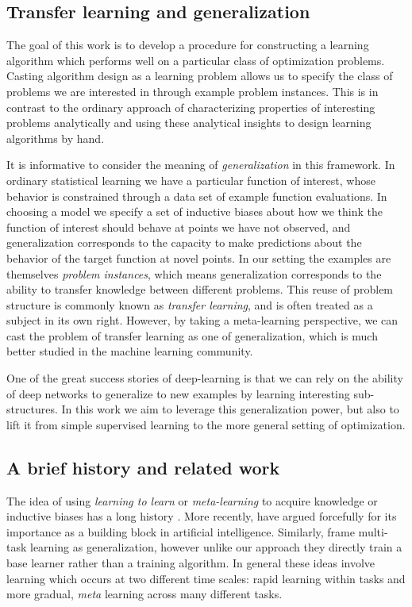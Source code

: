 \subsection{Transfer learning and generalization}

The goal of this work is to develop a procedure for constructing a learning
algorithm which performs well on a particular class of optimization problems.
Casting algorithm design as a learning problem allows us to specify the class
of problems we are interested in through example problem instances.  This is in
contrast to the ordinary approach of characterizing properties of interesting
problems analytically and using these analytical insights to design learning
algorithms by hand.

It is informative to consider the meaning of \emph{generalization} in this
framework.  In ordinary statistical learning we have a particular function of
interest, whose behavior is constrained through a data set of example function
evaluations.  In choosing a model we specify a set of inductive biases about
how we think the function of interest should behave at points we have not
observed, and generalization corresponds to the capacity to make predictions
about the behavior of the target function at novel points.
In our setting the examples are themselves \emph{problem instances}, which
means generalization corresponds to the ability to transfer knowledge between
different problems.  This reuse of problem structure is commonly known as
\emph{transfer learning}, and is often treated as a subject in its own right.
However, by taking a meta-learning perspective, we can cast the problem of
transfer learning as one of generalization, which is much better studied in the
machine learning community.

One of the great success stories of deep-learning is that we can rely on the
ability of deep networks to generalize to new examples by learning interesting
sub-structures. In this work we aim to leverage this generalization power, but
also to lift it from simple supervised learning to the more general setting of
optimization.

\subsection{A brief history and related work}

The idea of using \emph{learning to learn} or \emph{meta-learning} to acquire
knowledge or inductive biases has a long history \citep{thrun:1998}. More
recently, \cite{lake:2016} have argued forcefully for its importance as a
building block in artificial intelligence. Similarly, \cite{santoro:2016}
frame multi-task learning as generalization, however unlike our approach they
directly train a base learner rather than a training algorithm.  In general
these ideas involve learning which occurs at two different time scales: rapid
learning within tasks and more gradual, \emph{meta} learning across many
different tasks.

